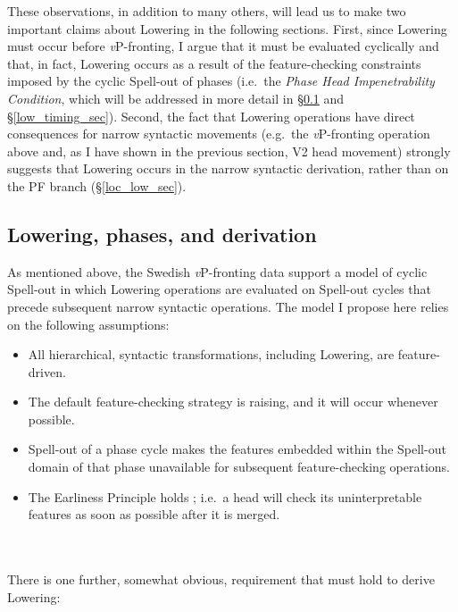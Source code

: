 These observations, in addition to many others, will lead us to make two important claims about Lowering in the following sections. First, since Lowering must occur before {\it v}P-fronting, I argue that it must be evaluated cyclically and that, in fact, Lowering occurs as a result of the feature-checking constraints imposed by the cyclic Spell-out of phases (i.e.\ the {\it Phase Head Impenetrability Condition}, which will be addressed in more detail in \S\ref{Low_cyclic_sec} and \S\ref{low_timing_sec}). Second, the fact that Lowering operations have direct consequences for narrow syntactic movements (e.g.\ the {\it v}P-fronting operation above and, as I have shown in the previous section, V2 head movement) strongly suggests that Lowering occurs in the narrow syntactic derivation, rather than on the PF branch (\S\ref{loc_low_sec}).

\subsection{Lowering, phases, and derivation}\label{Low_cyclic_sec}
As mentioned above, the Swedish {\it v}P-fronting data support a model of cyclic Spell-out in which Lowering operations are evaluated on Spell-out cycles that precede subsequent narrow syntactic operations. The model I propose here relies on the following assumptions:

\singlespacing
\begin{minipage}{5in}
\begin{itemize}
\item All hierarchical, syntactic transformations, including Lowering, are feature-driven.
\item The default feature-checking strategy is raising, and it will occur whenever possible.
\item Spell-out of a phase cycle makes the features embedded within the Spell-out domain of that phase unavailable for subsequent feature-checking operations.\footnotemark
\item The Earliness Principle holds \citep{pesetsky1989}; i.e.\ a head will check its uninterpretable features as soon as possible after it is merged.
\end{itemize}
\end{minipage}\\\\
\onehalfspacing
There is one further, somewhat obvious, requirement that must hold to derive Lowering:

